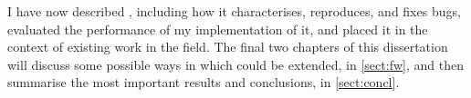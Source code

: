 I have now described {\technique}, including how it characterises,
reproduces, and fixes bugs, evaluated the performance of my
implementation of it, and placed it in the context of existing work in
the field.  The final two chapters of this dissertation will discuss
some possible ways in which {\technique} could be extended, in
\autoref{sect:fw}, and then summarise the most important results and
conclusions, in \autoref{sect:concl}.

